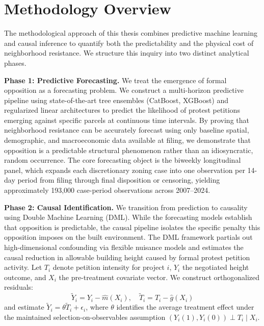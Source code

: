 \documentclass[11pt, letterpaper, oneside]{article}
\begin{document}


\section{Methodology Overview}
\label{sec:methodology}

The methodological approach of this thesis combines predictive machine learning and causal inference to quantify both the predictability and the physical cost of neighborhood resistance. We structure this inquiry into two distinct analytical phases.

\textbf{Phase 1: Predictive Forecasting.} We treat the emergence of formal opposition as a forecasting problem. We construct a multi-horizon predictive pipeline using state-of-the-art tree ensembles (CatBoost, XGBoost) and regularized linear architectures to predict the likelihood of protest petitions emerging against specific parcels at continuous time intervals. By proving that neighborhood resistance can be accurately forecast using only baseline spatial, demographic, and macroeconomic data available at filing, we demonstrate that opposition is a predictable structural phenomenon rather than an idiosyncratic, random occurrence. The core forecasting object is the biweekly longitudinal panel, which expands each discretionary zoning case into one observation per 14-day period from filing through final disposition or censoring, yielding approximately 193,000 case-period observations across 2007--2024.

\textbf{Phase 2: Causal Identification.} We transition from prediction to causality using Double Machine Learning (DML). While the forecasting models establish that opposition is predictable, the causal pipeline isolates the specific penalty this opposition imposes on the built environment. The DML framework partials out high-dimensional confounding via flexible nuisance models and estimates the causal reduction in allowable building height caused by formal protest petition activity. Let $T_i$ denote petition intensity for project $i$, $Y_i$ the negotiated height outcome, and $X_i$ the pre-treatment covariate vector. We construct orthogonalized residuals:
\begin{equation}
\tilde{Y}_i = Y_i - \hat{m}(X_i), \quad \tilde{T}_i = T_i - \hat{g}(X_i)
\end{equation}
and estimate $\tilde{Y}_i = \theta \tilde{T}_i + \epsilon_i$, where $\theta$ identifies the average treatment effect under the maintained selection-on-observables assumption $(Y_i(1), Y_i(0)) \perp T_i \mid X_i$.
\end{document}
